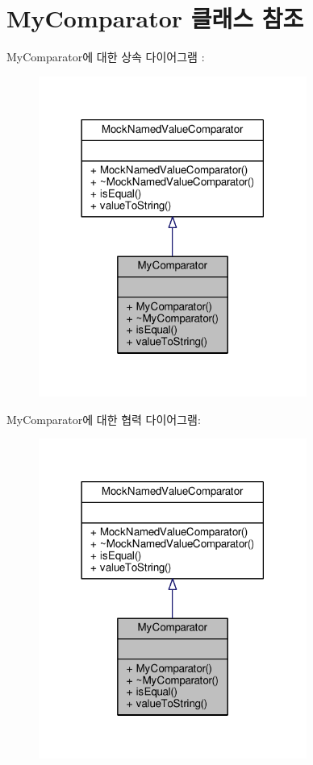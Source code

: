 \hypertarget{class_my_comparator}{}\section{My\+Comparator 클래스 참조}
\label{class_my_comparator}


My\+Comparator에 대한 상속 다이어그램 \+: 
\nopagebreak
\begin{figure}[H]
\begin{center}
\leavevmode
\includegraphics[width=249pt]{class_my_comparator__inherit__graph}
\end{center}
\end{figure}


My\+Comparator에 대한 협력 다이어그램\+:
\nopagebreak
\begin{figure}[H]
\begin{center}
\leavevmode
\includegraphics[width=249pt]{class_my_comparator__coll__graph}
\end{center}
\end{figure}
